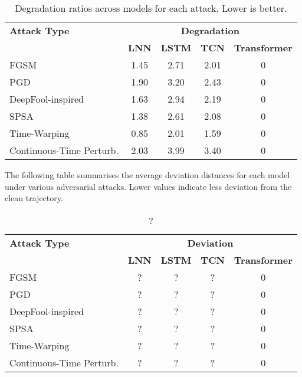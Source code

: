 \begin{table}[H]
    \centering
    \small
    \begin{tabular}{|l|cccc|}
    \hline
    \textbf{Attack Type} & \multicolumn{4}{c|}{\textbf{Degradation}} \\
    \cline{2-5}
     & \textbf{LNN} & \textbf{LSTM} & \textbf{TCN} & \textbf{Transformer} \\
    \hline
    FGSM                     & 1.45 & 2.71 & 2.01 & 0 \\
    PGD                      & 1.90 & 3.20 & 2.43 & 0 \\
    DeepFool-inspired        & 1.63 & 2.94 & 2.19 & 0 \\
    SPSA                     & 1.38 & 2.61 & 2.08 & 0 \\
    Time-Warping             & 0.85 & 2.01 & 1.59 & 0 \\
    Continuous-Time Perturb. & 2.03 & 3.99 & 3.40 & 0 \\
    \hline
    \end{tabular}
    \caption{Degradation ratios across models for each attack. Lower is better.}
    \label{tab:attack_results_degradation}
\end{table}

The following table summarises the average deviation distances for each model under various adversarial attacks. Lower values indicate less deviation from the clean trajectory.

\begin{table}[H]
    \centering
    \small
    \begin{tabular}{|l|cccc|}
    \hline
    \textbf{Attack Type} & \multicolumn{4}{c|}{\textbf{Deviation}} \\
    \cline{2-5}
     & \textbf{LNN} & \textbf{LSTM} & \textbf{TCN} & \textbf{Transformer} \\
    \hline
    FGSM                     & ? & ? & ? & 0 \\
    PGD                      & ? & ? & ? & 0 \\
    DeepFool-inspired        & ? & ? & ? & 0 \\
    SPSA                     & ? & ? & ? & 0 \\
    Time-Warping             & ? & ? & ? & 0 \\
    Continuous-Time Perturb. & ? & ? & ? & 0 \\
    \hline
    \end{tabular}
    \caption{?}
    \label{tab:attack_results_deviation}
\end{table}


